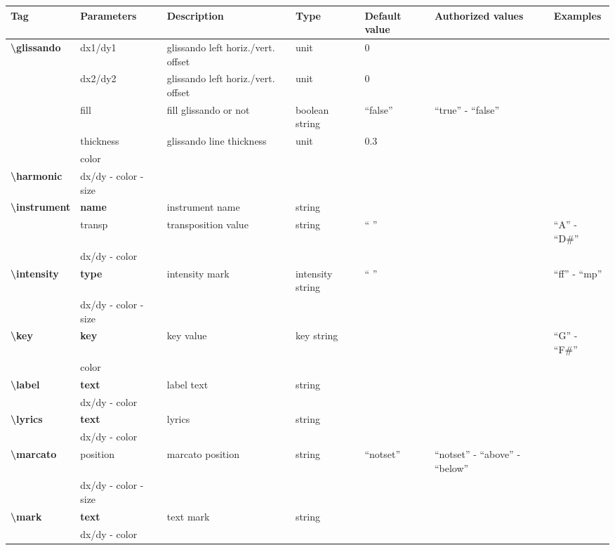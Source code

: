 \documentclass[a4paper, landscape, 10pt]{article}
\begin{document}
\begin{tabularx}{\linewidth}{p{3cm}p{3cm}p{5cm}p{3cm}p{2.5cm}p{3.5cm}p{4cm}}
    \hline
    \textbf{Tag}&\textbf{Parameters}&\textbf{Description}&\textbf{Type}&\textbf{Default value}&\textbf{Authorized values}&\textbf{Examples}\\
    \hline
    \textbf{\textbackslash{}glissando}&dx1/dy1&glissando left horiz./vert. offset&unit&0&&\\
    &dx2/dy2&glissando left horiz./vert. offset&unit&0&&\\
    &fill&fill glissando or not&boolean string&``false''&``true'' - ``false''&\\
    &thickness&glissando line thickness&unit&0.3&&\\
    &color&&&&&\\
    \hline
    \textbf{\textbackslash{}harmonic}&dx/dy - color - size&&&&&\\
    \hline
    \textbf{\textbackslash{}instrument}&\textbf{name}&instrument name&string&&&\\
    &transp&transposition value&string&`` ''&&``A'' - ``D\#''\\
    &dx/dy - color&&&&&\\
    \hline
    \textbf{\textbackslash{}intensity}&\textbf{type}&intensity mark&intensity string&`` ''&&``ff'' - ``mp''\\
    &dx/dy - color - size&&&&&\\
    \hline
    \textbf{\textbackslash{}key}&\textbf{key}&key value&key string&&&``G'' - ``F\#''\\
    &color&&&&&\\
    \hline
    \textbf{\textbackslash{}label}&\textbf{text}&label text&string&&&\\
    &dx/dy - color&&&&&\\
    \hline
    \textbf{\textbackslash{}lyrics}&\textbf{text}&lyrics&string&&&\\
    &dx/dy - color&&&&&\\
    \hline
    \textbf{\textbackslash{}marcato}&position&marcato position&string&``notset''&``notset'' - ``above'' - ``below''&\\
    &dx/dy - color - size&&&&&\\
    \hline
    \textbf{\textbackslash{}mark}&\textbf{text}&text mark&string&&&\\
    &dx/dy - color&&&&&\\

\end{tabularx}
\end{document}
